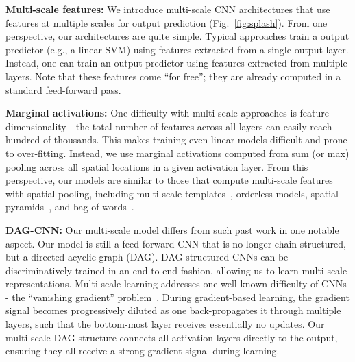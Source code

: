 \documentclass[10pt,twocolumn,letterpaper]{article}
\begin{document}
{\bf Multi-scale features:} We introduce multi-scale CNN architectures that use features at multiple scales for output prediction (Fig.~\ref{fig:splash}). From one perspective, our architectures are quite simple. Typical approaches train a output predictor (e.g., a linear SVM) using features extracted from a single output layer. Instead, one can train an output predictor using features extracted from multiple layers. Note that these features come ``for free''; they are already computed in a standard feed-forward pass. 

{\bf Marginal activations:} One difficulty with multi-scale approaches is feature dimensionality - the total number of features across all layers can easily reach hundred of thousands. This makes training even linear models difficult and prone to over-fitting. Instead, we use marginal activations computed from sum (or max) pooling across all spatial locations in a given activation layer. From this perspective, our models are similar to those that compute multi-scale features with spatial pooling, including multi-scale templates~\cite{felzenszwalb2008discriminatively}, orderless models\cite{Gong14}, spatial pyramids~\cite{spatial_pyramid}, and bag-of-words~\cite{sivic2003video}.

{\bf DAG-CNN:} Our multi-scale model differs from such past work in one notable aspect. Our model is still a feed-forward CNN that is no longer chain-structured, but a directed-acyclic graph (DAG). DAG-structured CNNs can be discriminatively trained in an end-to-end fashion, allowing us to learn multi-scale representations. Multi-scale learning addresses one well-known difficulty of CNNs - the ``vanishing gradient'' problem~\cite{bengio1994learning}. During gradient-based learning, the gradient signal becomes progressively diluted as one back-propagates it through multiple layers, such that the bottom-most layer receives essentially no updates. Our multi-scale DAG structure connects all activation layers directly to the output, ensuring they all receive a strong gradient signal during learning. 

\end{document}
